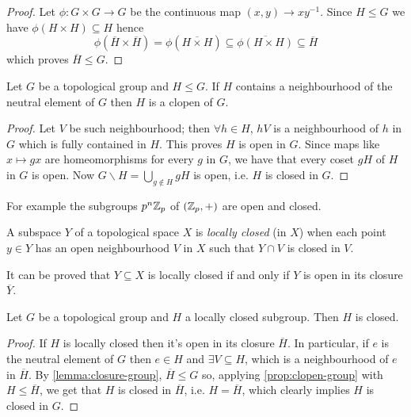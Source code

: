 		\begin{proof}
		 Let $\phi\colon G \times G \to G$ be the continuous map $(x, y) \to xy^{-1}$. Since $H \leq G$ we have $\phi(H \times H) \subseteq H$ hence
			\begin{equation*}
				\phi(\overline{H} \times \overline{H}) = \phi(\overline{H \times H}) \subseteq \overline{\phi(H \times H)} \subseteq \overline{H}
			\end{equation*}
			which proves $\overline{H} \leq G$.
			\begin{comment}
			\textit{(b)} We recall that $G$ is Hausdorff exactly when its diagonal $\Delta_G$ is closed in $G \times G$. We have this chain of implications
			\begin{center}
				G Hausdorff $\implies$ $\{e\}$ closed $\implies$ \\
				$\Delta_G = \phi^{-1}(e)$ closed in $G \times G$ $\implies$ G Hausdorff
			\end{center}
			which concludes the proof.
			\end{comment}
		\end{proof}
		\begin{prop}
			\label{prop:clopen-group}
			Let $G$ be a topological group and $H \leq G$. If $H$ contains a neighbourhood of the neutral element of $G$ then $H$ is a clopen of $G$.
		\end{prop}
		\begin{proof}
			Let $V$ be such neighbourhood; then $\forall h \in H$, $hV$ is a neighbourhood of $h$ in $G$ which is fully contained in $H$. This proves $H$ is open in $G$. Since maps like $x \mapsto gx$ are homeomorphisms for every $g$ in $G$, we have that every coset $gH$ of $H$ in $G$ is open. Now $G\backslash H = \bigcup_{g \notin H}gH$ is open, i.e. $H$ is closed in $G$.
		\end{proof}
		For example the subgroups $p^n\mathbb{Z}_p$ of $(\mathbb{Z}_p, +)$ are open and closed.
		\begin{defn}
			A subspace $Y$ of a topological space $X$ is \emph{locally closed} (in $X$) when each point $y \in Y$ has an open neighbourhood $V$ in $X$ such that $Y \cap V$ is closed in $V$.
		\end{defn}
		It can be proved that $Y \subseteq X$ is locally closed if and only if $Y$ is open in its closure $\overline{Y}$. 
		\begin{thm}
			Let $G$ be a topological group and $H$ a locally closed subgroup. Then $H$ is closed.
		\end{thm}
		\begin{proof}
			If $H$ is locally closed then it's open in its closure $\overline{H}$. In particular, if $e$ is the neutral element of $G$ then $e \in H$ and $\exists V \subseteq H$, which is a neighbourhood of $e$ in $\overline{H}$. By \cref{lemma:closure-group}, $\overline{H} \leq G$ so, applying \cref{prop:clopen-group} with $H \leq \overline{H}$, we get that $H$ is closed in $\overline{H}$, i.e. $H = \overline{H}$, which clearly implies $H$ is closed in $G$.
		\end{proof}
